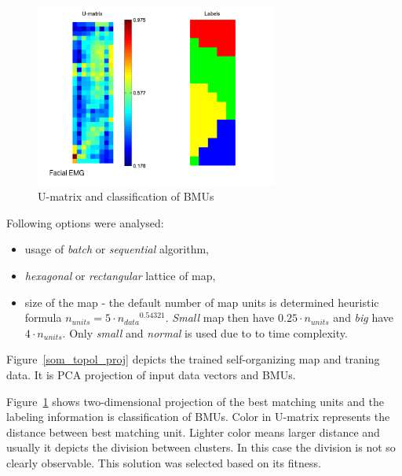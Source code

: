 \documentclass[a4paper]{IEEEtran}
\begin{document}
\begin{figure}[h]
	\centering
	\includegraphics[width=80mm]{som_umat}
	\caption{U-matrix and classification of BMUs}
	\label{som_umat}
\end{figure}

Following options were analysed:
\begin{itemize}
	\item usage of \textit{batch} or \textit{sequential} algorithm,
	\item \textit{hexagonal} or \textit{rectangular} lattice of map,
	\item size of the map - the default number of map units is determined heuristic formula 
	$ n_{units} = 5\cdot {n_{data}}^{0.54321} $. \textit{Small} map then
	have $ 0.25\cdot n_{units} $ and \textit{big} have $ 4\cdot n_{units} $. Only
	\textit{small} and \textit{normal} is used due to to time complexity.
\end{itemize}

Figure~\ref{som_topol_proj} depicts the trained self-organizing map and traning data.
It is PCA projection of input data vectors and BMUs.

Figure~\ref{som_umat} shows two-dimensional projection of the best matching units and
the labeling information is classification of BMUs.
Color in U-matrix represents the distance between best matching unit. Lighter color
means larger distance and usually it depicts the division between clusters. In this case
the division is not so clearly observable. This solution was selected based on
its fitness. %

\end{document}

